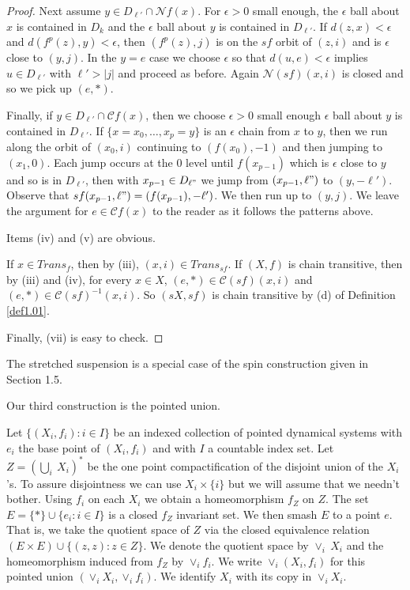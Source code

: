 \documentclass[12pt]{amsart}
\def \CC {\mathcal C}
\def \NN {\mathcal N}
\def \ep {\epsilon}
\numberwithin{equation}{section}
\begin{document}
\begin{proof}
Next assume $y \in D_{\ell'} \cap \NN f(x)$. For $\ep > 0$ small enough, the $\ep$ ball about $x$ is contained in $D_k$ and the
$\ep$ ball about $y$ is contained in $D_{\ell'}$. If $d(z,x) < \ep$ and $d(f^p(z),y) < \ep$, then $(f^p(z),j)$ is on
the $sf$ orbit of $(z,i)$ and is $\ep$ close to $(y,j)$. In the $y = e$ case we choose $\ep$ so that $d(u,e) < \ep$ implies $u \in D_{\ell'}$
with $\ell' > |j|$ and proceed as before. Again $\NN (sf)(x,i)$ is closed and so we pick up $(e,*)$.

Finally, if $y \in D_{\ell'} \cap \CC f(x)$, then we choose $\ep > 0$ small enough $\ep$ ball about $y$ is contained in $D_{\ell'}$.
 If $\{ x = x_0, \dots, x_p = y \}$ is an $\ep$ chain from $x$ to $y$, then we run along the
 orbit of $(x_0,i)$ continuing to $(f(x_0),-1)$ and then jumping to $(x_1,0)$.
Each jump occurs at the $0$ level until $f(x_{p-1})$ which is $\ep$ close to $y$ and so is in $D_{\ell'}$, then
with $x_{p-1} \in D_{\ell"}$ we jump from $(x_{p-1},\ell")$ to $(y,-\ell')$. Observe that $sf(x_{p-1},\ell") = (f(x_{p-1}),-\ell')$. We then run up to $(y,j)$. We leave the
argument for $e \in \CC f(x)$ to the reader as it follows the patterns above.


Items (iv) and (v) are obvious.


If $x \in Trans_f$, then by (iii), $(x,i) \in Trans_{sf}$. If $(X,f)$ is chain transitive, then by (iii) and (iv), for every $x \in X$,
$(e,*) \in \CC (sf)(x,i)$ and $(e,*) \in \CC (sf)^{-1}(x,i)$. So $(sX,sf)$ is chain transitive by (d) of Definition \ref{def1.01}.

Finally, (vii) is easy to check.

\end{proof}\vspace{.25cm}


The stretched suspension is a special case of the spin construction given in \cite{AG19} Section 1.5.\vspace{.25cm}

Our third construction is the pointed union.


Let $\{ (X_i,f_i) : i \in I \}$ be an indexed collection of pointed dynamical systems with $e_i$ the base point of $(X_i,f_i)$ and with
$I$ a countable index set. Let $Z = (\bigcup_i \ X_i)^*$ be the one point compactification of the disjoint union of the $X_i$'s. To assure disjointness
we can use $X_i \times \{ i \}$ but we will assume that we needn't bother. Using $f_i$ on each $X_i$ we obtain a homeomorphism $f_Z$ on $Z$. The
set $E = \{ * \} \cup \{ e_i : i \in I \}$ is a closed $f_Z$ invariant set. We then smash $E$ to a point $e$. That is,
we take the quotient space of $Z$ via the closed equivalence relation $(E \times E) \cup \{ (z,z) : z \in Z \}$. We denote the quotient space
by $\vee_i \ X_i$  and the homeomorphism induced from $f_Z$ by $\vee_i f_i$. We write $\vee_i (X_i,f_i)$ for this pointed union
$(\vee_i X_i, \vee_i f_i)$.
We identify $X_i$ with its copy in $\vee_i X_i$.
\end{document}
